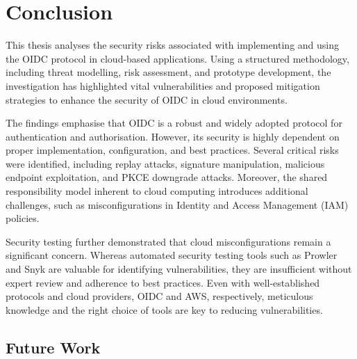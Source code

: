 \chapter{Conclusion}

This thesis analyses the security risks associated with implementing and using the OIDC protocol in cloud-based applications. Using a structured methodology, including threat modelling, risk assessment, and prototype development, the investigation has highlighted vital vulnerabilities and proposed mitigation strategies to enhance the security of OIDC in cloud environments.

The findings emphasise that OIDC is a robust and widely adopted protocol for authentication and authorisation. However, its security is highly dependent on proper implementation, configuration, and best practices. Several critical risks were identified, including replay attacks, signature manipulation, malicious endpoint exploitation, and PKCE downgrade attacks. Moreover, the shared responsibility model inherent to cloud computing introduces additional challenges, such as misconfigurations in Identity and Access Management (IAM) policies.

Security testing further demonstrated that cloud misconfigurations remain a significant concern. Whereas automated security testing tools such as Prowler and Snyk are valuable for identifying vulnerabilities, they are insufficient without expert review and adherence to best practices. Even with well-established protocols and cloud providers, OIDC and AWS, respectively, meticulous knowledge and the right choice of tools are key to reducing vulnerabilities.   


\section{Future Work}

